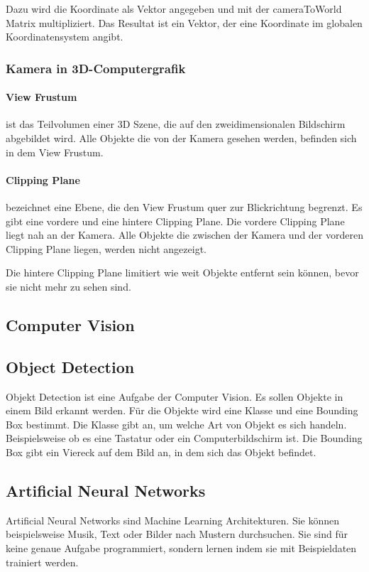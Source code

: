 \documentclass[german,a4paper, 12pt]{llncs}
\begin{document}
Dazu wird die Koordinate als Vektor angegeben und mit der cameraToWorld Matrix multipliziert. Das Resultat ist ein Vektor, der eine Koordinate im globalen Koordinatensystem angibt.\cite{unitycameratoworldmatrix,unitymultiplyoint}

\subsubsection{Kamera in 3D-Computergrafik}
\paragraph{View Frustum}
ist das Teilvolumen einer 3D Szene, die auf den zweidimensionalen Bildschirm abgebildet wird. Alle Objekte die von der Kamera gesehen werden, befinden sich in dem View Frustum.

\paragraph{Clipping Plane}
bezeichnet eine Ebene, die den View Frustum quer zur Blickrichtung begrenzt. 
Es gibt eine vordere und eine hintere Clipping Plane.
Die vordere Clipping Plane liegt nah an der Kamera. Alle Objekte die zwischen der Kamera und der vorderen Clipping Plane liegen, werden nicht angezeigt.

Die hintere Clipping Plane limitiert wie weit Objekte entfernt sein können, bevor sie nicht mehr zu sehen sind.


\subsection{Computer Vision}
\subsection{Object Detection}
Objekt Detection ist eine Aufgabe der Computer Vision. Es sollen Objekte in einem Bild erkannt werden. 
Für die Objekte wird eine Klasse und eine Bounding Box bestimmt. 
Die Klasse gibt an, um welche Art von Objekt es sich handeln. Beispielsweise ob es eine Tastatur oder ein Computerbildschirm ist.
Die Bounding Box gibt ein Viereck auf dem Bild an, in dem sich das Objekt befindet.

\subsection{Artificial Neural Networks}
Artificial Neural Networks sind Machine Learning Architekturen. Sie können beispielsweise Musik, Text oder Bilder nach Mustern durchsuchen. Sie sind für keine genaue Aufgabe programmiert, sondern lernen indem sie mit Beispieldaten trainiert werden. 
\end{document}
